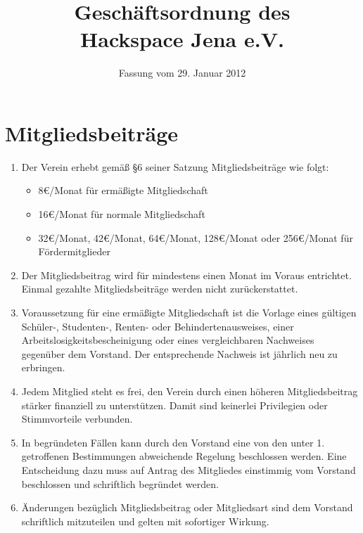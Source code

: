 \documentclass[fontsize=12pt,paper=a4,pagesize,headings=small]{scrartcl}
\title{Geschäftsordnung des \\ Hackspace Jena e.V.}
\date{Fassung vom 29. Januar 2012}
\begin{document}
\maketitle{}

\section{Mitgliedsbeiträge}

\begin{enumerate}
    \item Der Verein erhebt gemäß §6 seiner Satzung Mitgliedsbeiträge wie
        folgt:
        \begin{itemize}
            \item 8\euro{}/Monat für ermäßigte Mitgliedschaft
            \item 16\euro{}/Monat für normale Mitgliedschaft
            \item 32\euro{}/Monat, 42\euro{}/Monat, 64\euro{}/Monat,
                  128\euro{}/Monat oder 256\euro{}/Monat für
                  Fördermitglieder
        \end{itemize}

    \item Der Mitgliedsbeitrag wird für mindestens einen Monat im Voraus
        entrichtet. Einmal gezahlte Mitgliedsbeiträge werden nicht
        zurückerstattet.

    \item Voraussetzung für eine ermäßigte Mitgliedschaft ist die Vorlage
        eines gültigen Schüler-, Studenten-, Renten- oder
        Behindertenausweises, einer Arbeitslosigkeitsbescheinigung oder
        eines vergleichbaren Nachweises gegenüber dem Vorstand. Der
        entsprechende Nachweis ist jährlich neu zu erbringen.

    \item Jedem Mitglied steht es frei, den Verein durch einen höheren
        Mitgliedsbeitrag stärker finanziell zu unterstützen. Damit sind
        keinerlei Privilegien oder Stimmvorteile verbunden.

    \item In begründeten Fällen kann durch den Vorstand eine von den 
		unter 1. getroffenen Bestimmungen abweichende Regelung beschlossen 
		werden. Eine Entscheidung dazu muss auf Antrag des Mitgliedes 
		einstimmig vom Vorstand beschlossen und schriftlich begründet werden. 

    \item Änderungen bezüglich Mitgliedsbeitrag oder Mitgliedsart sind dem
        Vorstand schriftlich mitzuteilen und gelten mit sofortiger Wirkung.
\end{enumerate}
\end{document}
